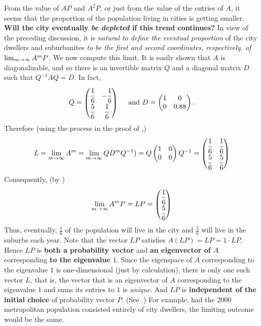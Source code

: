 From the value of \(AP\) and \(A^2 P\), or just from the value of the entries of \(A\), it seems that the proportion of the population living in cities is getting smaller.
\textbf{Will the city eventually \emph{be depleted} if this trend continues?}
In view of the preceding discussion, it is \emph{natural to define the eventual proportion} of the city dwellers and suburbanites \emph{to be the first and second coordinates, respectively, of} \(\lim_{m \to \infty} A^m P\).
We now compute this limit.
It is easily shown that \(A\) is diagonalizable, and so there is an invertible matrix \(Q\) and a diagonal matrix \(D\) such that \(Q^{-1} A Q = D\).
In fact,
\[
    Q = \begin{pmatrix}
        \cfrac{1}{6} & -\cfrac{1}{6} \\ \cfrac{5}{6} & \cfrac{1}{6}
    \end{pmatrix}
    \quad \text{ and }
    D = \begin{pmatrix}
        1 & 0 \\ 0 & 0.88
    \end{pmatrix}.
\]
Therefore (using the process in the proof of ,)
\[
    L = \lim_{m \to \infty} A^m = \lim_{m \to \infty} Q D^m Q^{-1}) = Q \begin{pmatrix} 1 & 0 \\ 0 & 0 \end{pmatrix} Q^{-1} =
    \begin{pmatrix}
        \cfrac{1}{6} & \cfrac{1}{6} \\ \cfrac{5}{6} & \cfrac{5}{6}
    \end{pmatrix}
\]
Consequently, (by )
\[
    \lim_{m \to \infty} A^m P = LP = \begin{pmatrix}
        \cfrac{1}{6} \\ \cfrac{5}{6}
    \end{pmatrix}
\]
Thus, eventually, \(\frac{1}{6}\) of the population will live in the city and \(\frac{5}{6}\) will live in the suburbs each year.
Note that the vector \(LP\) satisfies \(A (LP) = LP  = 1 \cdot LP\).
Hence \(LP\) is \textbf{both a probability vector} and \textbf{an eigenvector of \(A\)} corresponding \textbf{to the eigenvalue \(1\)}. Since the eigenspace of \(A\) corresponding to the eigenvalue \(1\) is one-dimensional (just by calculation),
there is only one such vector \(L\), that is, the vector that is an eigenvector of \(A\) corresponding to the eigenvalue \(1\) and sums its entries to \(1\) is \emph{unique}.
And \(LP\) is \textbf{independent of the initial choice} of probability vector \(P\).
(See .)
For example, had the 2000 metropolitan population consisted entirely of city dwellers, the
limiting outcome would be the same.

